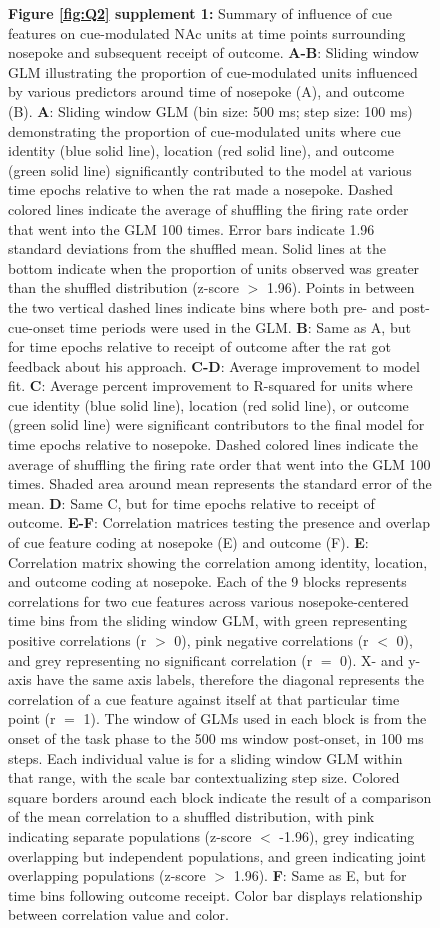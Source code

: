 \documentclass[11pt]{article}
\newcommand{\bsf}[1]{\textbf{#1}}
\begin{document}
\begin{figure}[ht!]
\caption*{\bsf{Figure \ref{fig:Q2} supplement 1:} Summary of influence of cue features on cue-modulated NAc units at time points surrounding nosepoke and subsequent receipt of outcome. \bsf{A-B}: Sliding window GLM illustrating the proportion of cue-modulated units influenced by various predictors around time of nosepoke (A), and outcome (B). \bsf{A}: Sliding window GLM (bin size: 500 ms; step size: 100 ms) demonstrating the proportion of cue-modulated units where cue identity (blue solid line), location (red solid line), and outcome (green solid line) significantly contributed to the model at various time epochs relative to when the rat made a nosepoke. Dashed colored lines indicate the average of shuffling the firing rate order that went into the GLM 100 times. Error bars indicate 1.96 standard deviations from the shuffled mean. Solid lines at the bottom indicate when the proportion of units observed was greater than the shuffled distribution (z-score $>$ 1.96). Points in between the two vertical dashed lines indicate bins where both pre- and post-cue-onset time periods were used in the GLM. \bsf{B}: Same as A, but for time epochs relative to receipt of outcome after the rat got feedback about his approach. \bsf{C-D}: Average improvement to model fit. \bsf{C}: Average percent improvement to R-squared for units where cue identity (blue solid line), location (red solid line), or outcome (green solid line) were significant contributors to the final model for time epochs relative to nosepoke. Dashed colored lines indicate the average of shuffling the firing rate order that went into the GLM 100 times. Shaded area around mean represents the standard error of the mean. \bsf{D}: Same C, but for time epochs relative to receipt of outcome. \bsf{E-F}: Correlation matrices testing the presence and overlap of cue feature coding at nosepoke (E) and outcome (F). \bsf{E}: Correlation matrix showing the correlation among identity, location, and outcome coding at nosepoke. Each of the 9 blocks represents correlations for two cue features across various nosepoke-centered time bins from the sliding window GLM, with green representing positive correlations (r $>$ 0), pink negative correlations (r $<$ 0), and grey representing no significant correlation (r $=$ 0). X- and y-axis have the same axis labels, therefore the diagonal represents the correlation of a cue feature against itself at that particular time point (r $=$ 1). The window of GLMs used in each block is from the onset of the task phase to the 500 ms window post-onset, in 100 ms steps. Each individual value is for a sliding window GLM within that range, with the scale bar contextualizing step size. Colored square borders around each block indicate the result of a comparison of the mean correlation to a shuffled distribution, with pink indicating separate populations (z-score $<$ -1.96), grey indicating overlapping but independent populations, and green indicating joint overlapping populations (z-score $>$ 1.96). \bsf{F}: Same as E, but for time bins following outcome receipt. Color bar displays relationship between correlation value and color.}
\label{fig:Q2SUPP1}
\end{figure} \clearpage
\end{document}
